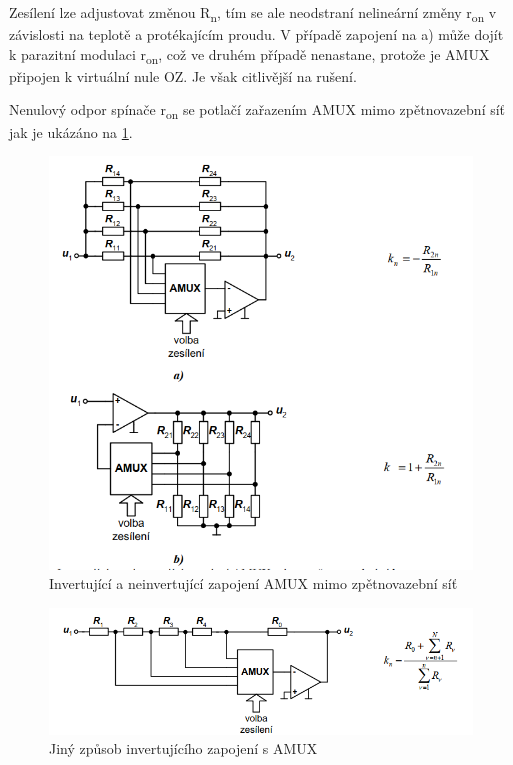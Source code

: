 Zesílení lze adjustovat změnou R\textsubscript{n}, tím se ale neodstraní nelineární změny r\textsubscript{on} v závislosti na teplotě a protékajícím proudu. V případě zapojení na a) může dojít k parazitní modulaci r\textsubscript{on}, což ve druhém případě nenastane, protože je AMUX připojen k virtuální nule OZ. Je však citlivější na rušení.

Nenulový odpor spínače r\textsubscript{on} se potlačí zařazením AMUX mimo zpětnovazební síť jak je ukázáno na \ref{fig:AMUX2}.
\begin{figure}[h]
   \begin{center}
     \includegraphics[scale=0.6]{images/Amux2.png}
   \end{center}
   \caption{Invertující a neinvertující zapojení AMUX mimo zpětnovazební síť}
   \label{fig:AMUX2}
\end{figure}

\begin{figure}[h]
   \begin{center}
     \includegraphics[scale=0.6]{images/Amux3.png}
   \end{center}
   \caption{Jiný způsob invertujícího zapojení s AMUX}
\end{figure}

